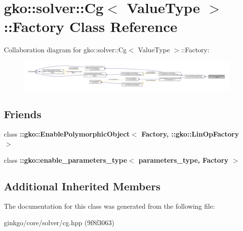 \hypertarget{classgko_1_1solver_1_1Cg_1_1Factory}{}\section{gko\+:\+:solver\+:\+:Cg$<$ Value\+Type $>$\+:\+:Factory Class Reference}
\label{classgko_1_1solver_1_1Cg_1_1Factory}


Collaboration diagram for gko\+:\+:solver\+:\+:Cg$<$ Value\+Type $>$\+:\+:Factory\+:
\nopagebreak
\begin{figure}[H]
\begin{center}
\leavevmode
\includegraphics[width=350pt]{classgko_1_1solver_1_1Cg_1_1Factory__coll__graph}
\end{center}
\end{figure}
\subsection*{Friends}
\begin{DoxyCompactItemize}
\item 
\mbox{\label{classgko_1_1solver_1_1Cg_1_1Factory_a27e9bbc94a1c1c59f40833153eda8f78}} 
class {\bfseries \+::gko\+::\+Enable\+Polymorphic\+Object$<$ Factory, \+::gko\+::\+Lin\+Op\+Factory $>$}
\item 
\mbox{\label{classgko_1_1solver_1_1Cg_1_1Factory_a0d176cbd42d6214e11aee8c30ca256fc}} 
class {\bfseries \+::gko\+::enable\+\_\+parameters\+\_\+type$<$ parameters\+\_\+type, Factory $>$}
\end{DoxyCompactItemize}
\subsection*{Additional Inherited Members}


The documentation for this class was generated from the following file\+:\begin{DoxyCompactItemize}
\item 
ginkgo/core/solver/cg.\+hpp (9f8f3063)\end{DoxyCompactItemize}
